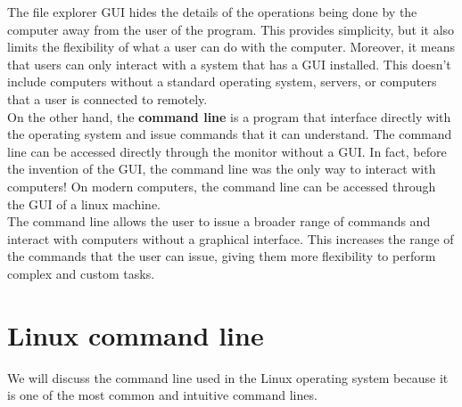 The file explorer GUI hides the details of the operations being done by the computer away from the user of the program. This provides simplicity, but it also limits the flexibility of what a user can do with the computer. Moreover, it means that users can only interact with a system that has a GUI installed. This doesn’t include computers without a standard operating system, servers, or computers that a user is connected to remotely. \\

On the other hand, the \textbf{command line} is a program that  interface directly with the operating system and issue commands that it can understand. The command line can be accessed directly through the monitor without a GUI. In fact, before the invention of the GUI, the command line was the only way to interact with computers!  On modern computers, the command line can be accessed through the GUI of a linux machine. \\

The command line allows the user to issue a broader range of commands and interact with computers without a graphical interface. 
This increases the range of the commands that the user can issue, giving them more flexibility to perform complex and custom tasks. \\

\section{Linux command line}

We will discuss the command line used in the Linux operating system because it is one of the most common and intuitive command lines. \\

